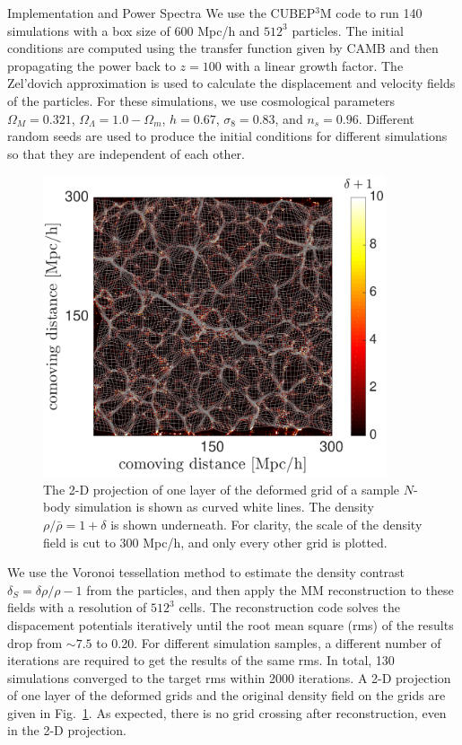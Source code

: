 \begin{section}{Implementation and Power Spectra}
  \label{sec:simulation}
  We use the \textsc{CUBEP$^3$M} code \cite{bib:Harnois2013} to run
  140 simulations with a box size of 600 Mpc/h and $512^3$ particles.
  The initial conditions are computed using the transfer function
  given by CAMB \cite{bib:Lewis2000} and then propagating the power
  back to $z=100$ with a linear growth factor.  The Zel'dovich
  approximation is used to calculate the displacement and velocity
  fields of the particles.  For these simulations, we use cosmological
  parameters $\Omega_M=0.321$, $\Omega_{\Lambda}=1.0-\Omega_m$,
  $h=0.67$, $\sigma_8=0.83$, and $n_s=0.96$.  Different random seeds
  are used to produce the initial conditions for different simulations
  so that they are independent of each other.

  \begin{figure}[t!]
    \centering
    \includegraphics[width=0.9\textwidth]{fig1.pdf}
    \caption{ The 2-D projection of one layer of the deformed grid of a sample
      $N$-body simulation is shown as curved white lines.  The
      density $\rho/\bar{\rho}=1+\delta$ is shown
      underneath. For clarity, the scale of the density field is cut to 
      300 Mpc/h, and only every other grid is plotted.}
    \label{fig:simandrec}
 \end{figure}

 We use the Voronoi tessellation method \cite{bib:Van1994} to estimate the density contrast
 $\delta_S=\delta\rho/\rho-1$ from the particles, and then apply the
 MM reconstruction to these fields with a resolution of $512^3$ cells.
 The reconstruction code solves the dispacement potentials iteratively
 until the root mean square (rms) of the results drop from $\sim 7.5$
 to 0.20. For different simulation samples, a different number of
 iterations are required to get the results of the same rms. In total,
 130 simulations converged to the target rms within 2000 iterations.  A 2-D projection
 of one layer of the deformed grids and the original density field on
 the grids are given in Fig.~\ref{fig:simandrec}.  As expected, there
 is no grid crossing after reconstruction, even in the 2-D projection.
 

\end{section}
